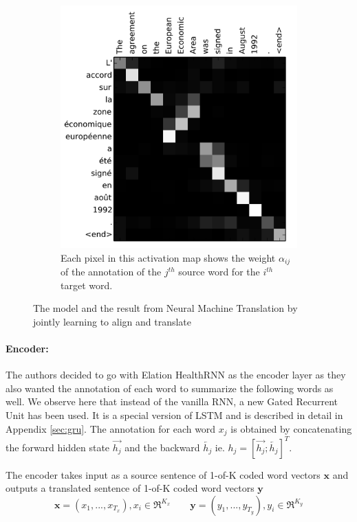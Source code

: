 \documentclass{article}
\begin{document}
\begin{figure}
\begin{subfigure}{0.45\textwidth}
			\includegraphics[width=1\textwidth]{fig/adatn2.png}
			\caption{Each pixel in this activation map shows the weight \(\alpha_{ij}\) of the annotation of the \(j^{th}\) source word for the \(i^{th}\) target word.}
		\end{subfigure}
		\caption{The model and the result from Neural Machine Translation by jointly learning to align and translate}
		\label{fig:bahatn}
	\end{figure}

	\paragraph{Encoder:} The authors decided to go with Elation HealthRNN as the encoder layer as they also wanted the annotation of each word to summarize the following words as well. We observe here that instead of the vanilla RNN, a new Gated Recurrent Unit has been used. It is a special version of LSTM and is described in detail in Appendix \ref{sec:gru}. The annotation for each word \(x_j\) is obtained by concatenating the forward hidden state \(\overrightarrow{h_j}\) and the backward \(\overleftarrow{h_j}\) ie. \(h_j = [\overrightarrow{h_j};\overleftarrow{h_j}]^T\).  
	
	The encoder takes input as a source sentence of 1-of-K coded word vectors \(\textbf{x}\) and outputs a translated sentence of 1-of-K coded word vectors \(\textbf{y}\)
	\[\textbf{x} = (x_1,..., x_{T_x}), x_i \in \Re^{K_x} \hspace{2em} \textbf{y} = (y_1,..., y_{T_y}), y_i \in \Re^{K_y}\]
	
\end{document}
